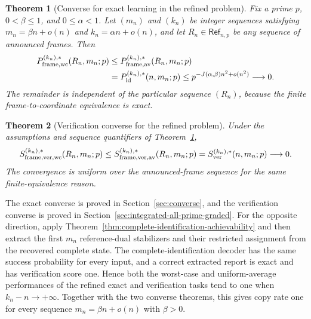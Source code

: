 \documentclass[11pt]{article}
\newcommand{\1}{\mathbf 1}
\theoremstyle{plain}
\newtheorem{theorem}{Theorem}[section]
\theoremstyle{definition}
\theoremstyle{remark}
\begin{document}
\begin{theorem}[Converse for exact learning in the refined problem]
\label{thm:refined-exact-converse}
Fix a prime $p$, $0<\beta\le1$, and $0\le\alpha<1$.  Let $(m_n)$ and
$(k_n)$ be integer sequences satisfying
$m_n=\beta n+o(n)$ and $k_n=\alpha n+o(n)$, and let
$R_n\in\mathsf{Ref}_{n,p}$ be any sequence of announced frames.  Then
\begin{align}
 P_{\rm frame,wc}^{(k_n),*}(R_n,m_n;p)
 &\le P_{\rm frame,av}^{(k_n),*}(R_n,m_n;p)
 \notag\\
 &=P_{\mathrm{id}}^{(k_n),*}(n,m_n;p)
 \le p^{-J(\alpha,\beta)n^2+o(n^2)}\longrightarrow0.
 \label{eq:main-results-converse}
\end{align}
The remainder is independent of the particular sequence $(R_n)$, because the
finite frame-to-coordinate equivalence is exact.
\end{theorem}

\begin{theorem}[Verification converse for the refined problem]
\label{thm:refined-verification-threshold}
Under the assumptions and sequence quantifiers of
Theorem~\ref{thm:refined-exact-converse},
\begin{equation}
 S_{\rm frame,ver,wc}^{(k_n),*}(R_n,m_n;p)
 \le S_{\rm frame,ver,av}^{(k_n),*}(R_n,m_n;p)
 =S_{\mathrm{ver}}^{(k_n),*}(n,m_n;p)\longrightarrow0.
 \label{eq:refined-verification-converse}
\end{equation}
The convergence is uniform over the announced-frame sequence for the same
finite-equivalence reason.
\end{theorem}

The exact converse is proved in Section~\ref{sec:converse}, and the
verification converse is proved in
Section~\ref{sec:integrated-all-prime-graded}.  For the opposite direction,
apply Theorem~\ref{thm:complete-identification-achievability} and then
extract the first $m_n$ reference-dual stabilizers and their restricted
assignment from the recovered complete state.  The complete-identification
decoder has the same success probability for every input, and a correct
extracted report is exact and has verification score one.  Hence both the
worst-case and uniform-average performances of the refined exact and
verification tasks tend to one when $k_n-n\to+\infty$.  Together with the two
converse theorems, this gives copy rate one for every sequence
$m_n=\beta n+o(n)$ with $\beta>0$.
\end{document}
